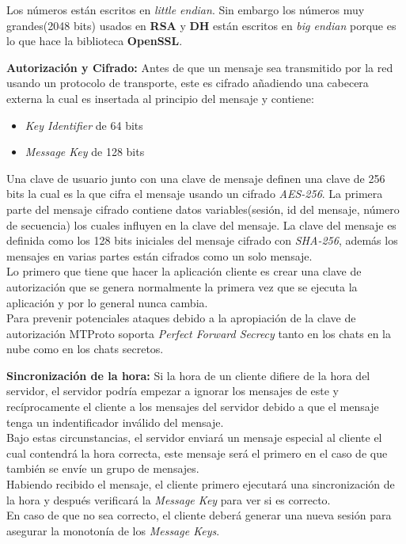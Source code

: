 \begin{description}
Los números están escritos en \emph{little endian}. Sin embargo los números muy grandes(2048 bits) usados en \textbf{RSA} y \textbf{DH} están escritos en \emph{big endian} porque es lo que hace la biblioteca \textbf{OpenSSL}.
	\item \textbf{Autorización y Cifrado:}
			Antes de que un mensaje sea transmitido por la red usando un protocolo de transporte, este es cifrado añadiendo una cabecera externa la cual es insertada al principio del mensaje y contiene:
	\begin{itemize}
		\item \emph{Key Identifier} de 64 bits
		\item \emph{Message Key} de 128 bits
	\end{itemize}
Una clave de usuario junto con una clave de mensaje definen una clave de 256 bits la cual es la que cifra el mensaje usando un cifrado \emph{AES-256}.
La primera parte del mensaje cifrado contiene datos variables(sesión, id del mensaje, número de secuencia) los cuales influyen en la clave del mensaje. La clave del mensaje es definida como los 128 bits iniciales del mensaje cifrado con \emph{SHA-256}, 
además los mensajes en varias partes están cifrados como un solo mensaje.\\
Lo primero que tiene que hacer la aplicación cliente es crear una clave de autorización que se genera normalmente la primera vez que se ejecuta la aplicación y por lo general nunca cambia.\\
Para prevenir potenciales ataques debido a la apropiación de la clave de autorización MTProto soporta \emph{Perfect Forward Secrecy} tanto en los chats en la nube como en los chats secretos.
	\item \textbf{Sincronización de la hora:}
Si la hora de un cliente difiere de la hora del servidor, el servidor podría empezar a ignorar los mensajes de este y recíprocamente el cliente a los mensajes del servidor debido a que el mensaje tenga un indentificador inválido del mensaje.\\
Bajo estas circunstancias, el servidor enviará un mensaje especial al cliente el cual contendrá la hora correcta, este mensaje será el primero en el caso de que también se envíe un grupo de mensajes.\\
Habiendo recibido el mensaje, el cliente primero ejecutará una sincronización de la hora y después verificará la \emph{Message Key} para ver si es correcto.\\
En caso de que no sea correcto, el cliente deberá generar una nueva sesión para asegurar la monotonía de los \emph{Message Keys}.
\end{description}

